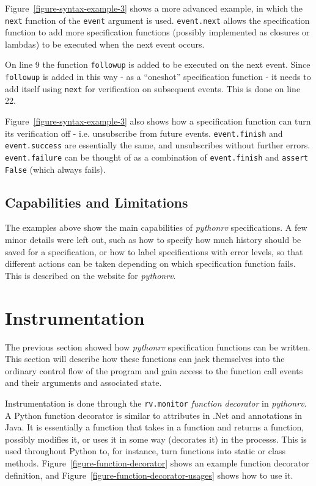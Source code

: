 \documentclass[a4paper,11pt]{kth-mag}
\begin{document}
Figure~\ref{figure-syntax-example-3} shows a more advanced example, in which
the \texttt{next} function of the \texttt{event} argument is used.
\texttt{event.next} allows the specification function to add more specification
functions (possibly implemented as closures or lambdas) to be executed when the
next event occurs.

On line 9 the function \texttt{followup} is added to be executed on the next
event. Since \texttt{followup} is added in this way - as a ``oneshot''
specification function - it needs to add itself using \texttt{next} for
verification on subsequent events. This is done on line 22.

Figure~\ref{figure-syntax-example-3} also shows how a specification function
can turn its verification off - i.e. unsubscribe from future events.
\texttt{event.finish} and \texttt{event.success} are essentially the same, and
unsubscribes without further errors. \texttt{event.failure} can be thought of
as a combination of \texttt{event.finish} and \texttt{assert False} (which
always fails).


\subsection{Capabilities and Limitations}

The examples above show the main capabilities of \textit{pythonrv}
specifications. A few minor details were left out, such as how to specify how
much history should be saved for a specification, or how to label
specifications with error levels, so that different actions can be taken
depending on which specification function fails. This is described on the website for
\textit{pythonrv}.


\section{Instrumentation} \label{section-approach-instrumentation}

The previous section showed how \textit{pythonrv} specification functions can
be written. This section will describe how these functions can jack themselves
into the ordinary control flow of the program and gain access to the function
call events and their arguments and associated state.

Instrumentation is done through the \texttt{rv.monitor} \textit{function
decorator} in \textit{pythonrv}. A Python function decorator is similar to
attributes in .Net and annotations in Java. It is essentially a function that
takes in a function and returns a function, possibly modifies it, or uses it in
some way (decorates it) in the processs. This is used throughout Python to, for
instance, turn functions into static or class methods.
Figure~\ref{figure-function-decorator} shows an example function decorator
definition, and Figure~\ref{figure-function-decorator-usages} shows how to use
it.
\end{document}
